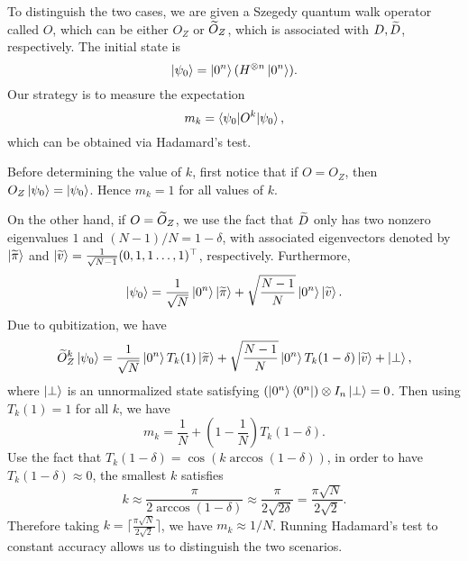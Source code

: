 \begin{exam}
To distinguish the two cases, we are given a Szegedy quantum walk operator called $O$, which can be either $O_Z$ or $\widetilde{O}_Z$, which is associated with $D,\widetilde{D}$, respectively. The initial state is 
\begin{equation}
\ket{\psi_0}=\ket{0^n}(H^{\otimes n} \ket{0^n}).
\end{equation}
Our strategy is to measure the expectation 
\begin{equation}
m_k=\braket{\psi_0|O^k |\psi_0},
\end{equation}
which can be obtained via Hadamard's test.

Before determining the value of $k$, first notice that if $O=O_Z$, then $O_{Z}\ket{\psi_0}=\ket{\psi_0}$. Hence $m_k=1$ for all values of $k$. 

On the other hand, if $O=\widetilde{O}_Z$, we use the fact that $\widetilde{D}$ only has two nonzero eigenvalues $1$ and $(N-1)/N=1-\delta$, with associated eigenvectors denoted by $\ket{\widetilde{\pi}}$ and $\ket{\widetilde{v}}=\frac{1}{\sqrt{N-1}}(0,1,1\ldots,1)^{\top}$, respectively. 
Furthermore,
\begin{equation}
\ket{\psi_0}=\frac{1}{\sqrt{N}}\ket{0^n}\ket{\widetilde{\pi}}+\sqrt{\frac{N-1}{N}}\ket{0^n}\ket{\widetilde{v}}.
\end{equation}
Due to qubitization, we have
\begin{equation}\label{eqn:tmp_OZk_eval}
\widetilde{O}_Z^k\ket{\psi_0}=\frac{1}{\sqrt{N}}\ket{0^n}T_k(1)\ket{\widetilde{\pi}}+\sqrt{\frac{N-1}{N}}\ket{0^n}T_k(1-\delta)\ket{\widetilde{v}}+\ket{\perp},
\end{equation}
where $\ket{\perp}$ is an unnormalized state satisfying $(\ket{0^n}\bra{0^n})\otimes I_n \ket{\perp}=0$. 
Then using $T_k(1)=1$ for all $k$, we have
\begin{equation}
m_k=\frac{1}{N}+\left(1-\frac{1}{N}\right)T_k(1-\delta).
\end{equation}
Use the fact that $T_k(1-\delta)=\cos(k\arccos(1-\delta))$, in order to have $T_k(1-\delta)\approx 0$, the smallest $k$ satisfies
\begin{equation}\label{eqn:deg_cheb_marked}
k\approx \frac{\pi}{2\arccos(1-\delta)}\approx \frac{\pi}{2\sqrt{2\delta}}=\frac{\pi\sqrt{N}}{2\sqrt{2}}.
\end{equation}
Therefore taking $k=\lceil\frac{\pi\sqrt{N}}{2\sqrt{2}} \rceil$, we have $m_k\approx 1/N$. Running Hadamard's test to constant accuracy allows us to distinguish the two scenarios.
\end{exam}


